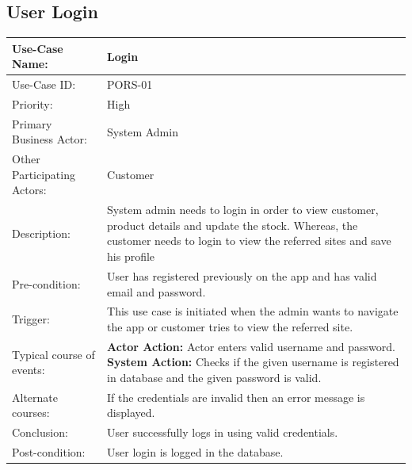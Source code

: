 \subsection{User Login}
\begin{center}
    \begin{tabular}{ @{}|p{7cm}||p{7cm}|  }
    \hline
    Use-Case Name: & Login  \\ \hline
    Use-Case ID: & PORS-01 \\ \hline
    Priority: & High \\ \hline
    Primary Business Actor: & System Admin \\ \hline
    Other Participating Actors: & Customer \\ \hline
    Description: & System admin needs to login in order to view customer, product details and update the stock. Whereas, the customer needs to login to view the referred sites and save his profile \\ \hline
    Pre-condition: & User has registered previously on the app and has valid email and password.  \\ \hline
    Trigger: & This use case is initiated when the admin wants to navigate the app or customer tries to view the referred site. \\ \hline
    Typical course of events: & \textbf{Actor Action:} \newline Actor enters valid username and password. \newline \textbf{System Action:} \newline Checks if the given username is registered in database and the given password is valid.
 \\ \hline
    Alternate courses: & If the credentials are invalid then an error message is displayed.  \\ \hline
    Conclusion: &  User successfully logs in using valid credentials.\\ \hline
    Post-condition: & User login is logged in the database. \\ \hline
    \end{tabular}
\end{center}

